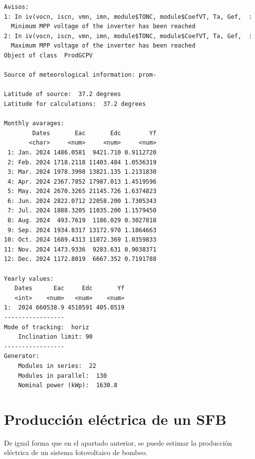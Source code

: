 \begin{verbatim}
Avisos:
1: In iv(vocn, iscn, vmn, imn, module$TONC, module$CoefVT, Ta, Gef,  :
  Minimum MPP voltage of the inverter has been reached
2: In iv(vocn, iscn, vmn, imn, module$TONC, module$CoefVT, Ta, Gef,  :
  Maximum MPP voltage of the inverter has been reached
Object of class  ProdGCPV 

Source of meteorological information: prom- 

Latitude of source:  37.2 degrees
Latitude for calculations:  37.2 degrees

Monthly avarages:
        Dates       Eac       Edc        Yf
       <char>     <num>     <num>     <num>
 1: Jan. 2024 1486.0581  9421.710 0.9112720
 2: Feb. 2024 1718.2118 11403.484 1.0536319
 3: Mar. 2024 1978.3998 13821.135 1.2131830
 4: Apr. 2024 2367.7852 17987.013 1.4519596
 5: May. 2024 2670.3265 21145.726 1.6374823
 6: Jun. 2024 2822.0712 22058.200 1.7305343
 7: Jul. 2024 1888.3205 11035.200 1.1579450
 8: Aug. 2024  493.7619  1186.029 0.3027818
 9: Sep. 2024 1934.8317 13172.970 1.1864663
10: Oct. 2024 1689.4313 11072.369 1.0359833
11: Nov. 2024 1473.9336  9283.631 0.9038371
12: Dec. 2024 1172.8019  6667.352 0.7191788

Yearly values:
   Dates      Eac     Edc       Yf
   <int>    <num>   <num>    <num>
1:  2024 660538.9 4510591 405.0519
-----------------
Mode of tracking:  horiz 
    Inclination limit: 90 
-----------------
Generator:
    Modules in series:  22 
    Modules in parallel:  130 
    Nominal power (kWp):  1630.8
\end{verbatim}

\section{Producción eléctrica de un SFB}
\label{sec:org0a8fe9d}
De igual forma que en el apartado anterior, se puede estimar la producción eléctrica de un sistema fotovoltaico de bombeo.

